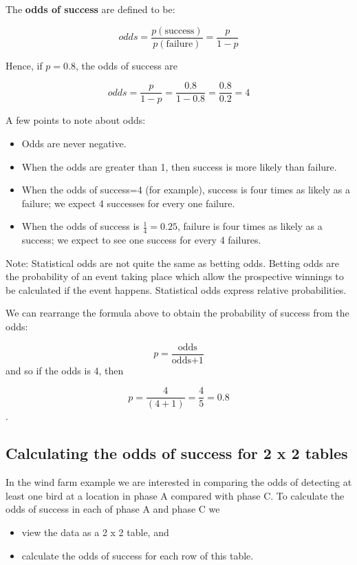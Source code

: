 \documentclass[
  oneside]{krantz}
\providecommand{\tightlist}{%
  \setlength{\itemsep}{0pt}\setlength{\parskip}{0pt}}
\begin{document}
The \textbf{odds of success} are defined to be:

\[odds=\frac{p(\textrm{success})}{p(\textrm{failure})} = \frac{p}{1-p}\]

Hence, if \(p=0.8\), the odds of success are

\[odds=\frac{p}{1-p}=\frac{0.8}{1-0.8}=\frac{0.8}{0.2}=4\]

A few points to note about odds:

\begin{itemize}
\tightlist
\item
  Odds are never negative.
\item
  When the odds are greater than 1, then success is more likely than failure.
\item
  When the odds of success=4 (for example), success is four times as likely as a failure; we expect 4 successes for every one failure.
\item
  When the odds of success is \(\frac{1}{4}=0.25\), failure is four times as likely as a success; we expect to see one success for every 4 failures.
\end{itemize}

Note: Statistical odds are not quite the same as betting odds. Betting odds are the probability of an event taking place which allow the prospective winnings to be calculated if the event happens. Statistical odds express relative probabilities.

We can rearrange the formula above to obtain the probability of success from the odds:

\[p=\frac{\textrm{odds}}{\textrm{odds+1}}\]
and so if the odds is 4, then

\[p=\frac{4}{(4+1)}=\frac{4}{5}=0.8\].

\hypertarget{calculating-the-odds-of-success-for-2-x-2-tables}{%
\subsection{Calculating the odds of success for 2 x 2 tables}\label{calculating-the-odds-of-success-for-2-x-2-tables}}

In the wind farm example we are interested in comparing the odds of detecting at least one bird at a location in phase A compared with phase C. To calculate the odds of success in each of phase A and phase C we

\begin{itemize}
\item
  view the data as a 2 x 2 table, and
\item
  calculate the odds of success for each row of this table.
\end{itemize}
\end{document}
